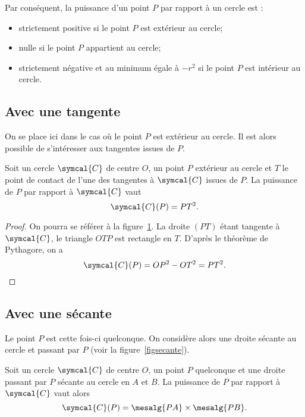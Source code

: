 Par conséquent, la puissance d'un point $P$ par rapport à un cercle est :
\begin{itemize}
\item strictement positive si le point $P$ est extérieur au cercle;
\item nulle si le point $P$ appartient au cercle;
\item strictement négative et au minimum égale à $-r^2$ si le point $P$ est intérieur au cercle.
\end{itemize}

\subsection{Avec une tangente}\label{subsectangente}
On se place ici dans le cas où le point $P$ est extérieur au cercle. Il est alors possible de s'intéresser aux tangentes issues de $P$.
\begin{thm}
Soit un cercle $\symcal{C}$ de centre $O$, un point $P$ extérieur au cercle et $T$ le point de contact de l'une des tangentes à $\symcal{C}$ issues de $P$. La puissance de $P$ par rapport à $\symcal{C}$ vaut
\[\symcal{C}(P)=PT^2.\]
\end{thm}


\begin{proof}
On pourra se référer à la figure \ref{figtangente}. La droite $(PT)$ étant tangente à $\symcal{C}$, le triangle $OTP$ est rectangle en $T$. D'après le théorème de Pythagore, on a 
\[\symcal{C}(P)=OP^2-OT^2=PT^2.\qedhere\]
\end{proof}

\begin{figure}[ht]
\centering
{}
\figcaption{}\label{figtangente}
\end{figure}

\subsection{Avec une sécante}\label{subsecsecante}
Le point $P$ est cette fois-ci quelconque. On considère alors une droite sécante au cercle et passant par $P$ (voir la figure \ref{figsecante}).
\begin{thm}
Soit un cercle $\symcal{C}$ de centre $O$, un point $P$ quelconque et une droite passant par $P$ sécante au cercle en $A$ et $B$. La puissance de $P$ par rapport à $\symcal{C}$ vaut alors
\[\symcal{C}(P)=\mesalg{PA}\times\mesalg{PB}.\]
\end{thm}

